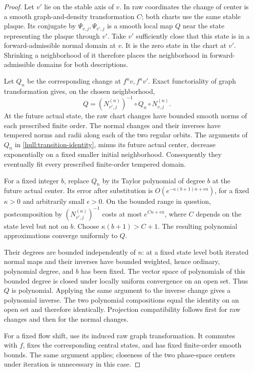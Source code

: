 \begin{proof}
Let $v'$ lie on the stable axis of $v$. In raw coordinates the change
of center is a smooth graph-and-density transformation $C$; both charts
use the same stable plaque. Its conjugate by $\Psi_{v,j},\Psi_{v',j}$ is
a smooth local map $Q$ near the state representing the plaque through
$v'$. Take $v'$ sufficiently close that this state is in a
forward-admissible normal domain at $v$. It is the zero state in the
chart at $v'$. Shrinking a neighborhood of it therefore places the
neighborhood in forward-admissible domains for both descriptions.

Let $Q_n$ be the corresponding change at $f^n v,f^n v'$. Exact
functoriality of graph transformation gives, on the chosen neighborhood,
\begin{equation}\label{hull:transition-identity}
 Q=(N_{v',j}^{(n)})^{-1}\circ Q_n\circ N_{v,j}^{(n)}.
\end{equation}
At the future actual state, the raw chart changes have bounded smooth
norms of each prescribed finite order. The normal changes and their
inverses have tempered norms and radii along each of the two regular
orbits. The arguments of $Q_n$ in
\eqref{hull:transition-identity}, minus its future actual center, decrease
exponentially on a fixed smaller initial neighborhood. Consequently
they eventually fit every prescribed finite-order tempered domain.

For a fixed integer $b$, replace $Q_n$ by its Taylor polynomial of degree
$b$ at the future actual center. Its error after substitution is
$O(e^{-\kappa(b+1)n+\epsilon n})$, for a fixed $\kappa>0$ and arbitrarily
small $\epsilon>0$. On the bounded range in question, postcomposition by
$(N_{v',j}^{(n)})^{-1}$ costs at most $e^{Cn+\epsilon n}$, where $C$
depends on the state level but not on $b$. Choose
$\kappa(b+1)>C+1$. The resulting polynomial approximations converge
uniformly to $Q$.

Their degrees are bounded independently of $n$: at a fixed state level
both iterated normal maps and their inverses have bounded weighted, hence
ordinary, polynomial degree, and $b$ has been fixed. The vector space of
polynomials of this bounded degree is closed under locally uniform
convergence on an open set. Thus $Q$ is polynomial. Applying the same
argument to the inverse change gives a polynomial inverse. The two
polynomial compositions equal the identity on an open set and therefore
identically. Projection compatibility follows first for raw changes and
then for the normal changes.

For a fixed flow shift, use its induced raw graph transformation. It
commutes with $f$, fixes the corresponding central states, and has fixed
finite-order smooth bounds. The same argument applies; closeness of the
two phase-space centers under iteration is unnecessary in this case.
\end{proof}

